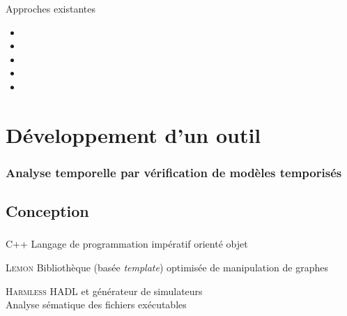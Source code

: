\documentclass{beamer}
\begin{document}
  \begin{frame}
    \frametitle{\secname}
    
    \begin{exampleblock}{Approches existantes}
      \tiny
      \begin{itemize}
        \item {}
        \item {}
        \item {}
        \item {}
        \item {}
      \end{itemize}
    \end{exampleblock}
  \end{frame}

  \section{Développement d'un outil}
  \begin{frame}
    \frametitle{Analyse temporelle par vérification de modèles temporisés}
    \tableofcontents[currentsection]
  \end{frame}
  
  \subsection{Conception}
  \begin{frame}
    \frametitle{\secname}
    \framesubtitle{\subsecname}
    \small
    \begin{block}{\textsc{C++}}
      Langage de programmation impératif orienté objet \\
      \tiny
    \end{block}

    \begin{block}{\textsc{Lemon}}
      Bibliothèque (basée \emph{template}) optimisée de manipulation de graphes \\
      \tiny
    \end{block}

    \begin{block}{\textsc{Harmless}}
      HADL et générateur de simulateurs \\
      Analyse sématique des fichiers exécutables \\
      \tiny
    \end{block}
  \end{frame}
\end{document}
